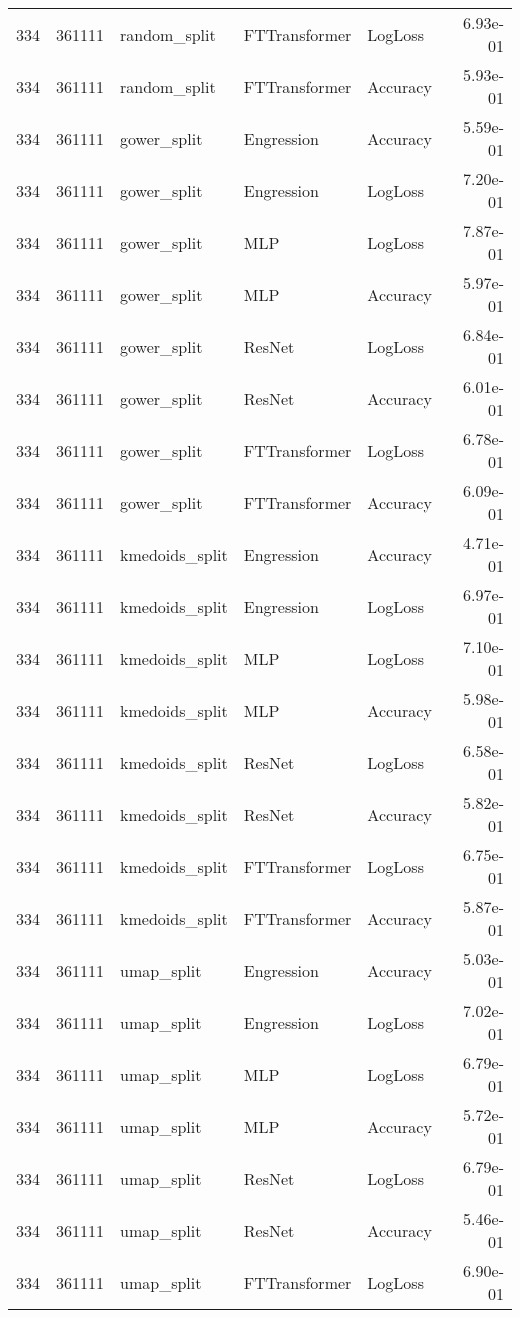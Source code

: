 \begin{tabular}{rrlllr}
334 & 361111 & random\_split & FTTransformer & LogLoss & 6.93e-01 \\
334 & 361111 & random\_split & FTTransformer & Accuracy & 5.93e-01 \\
334 & 361111 & gower\_split & Engression & Accuracy & 5.59e-01 \\
334 & 361111 & gower\_split & Engression & LogLoss & 7.20e-01 \\
334 & 361111 & gower\_split & MLP & LogLoss & 7.87e-01 \\
334 & 361111 & gower\_split & MLP & Accuracy & 5.97e-01 \\
334 & 361111 & gower\_split & ResNet & LogLoss & 6.84e-01 \\
334 & 361111 & gower\_split & ResNet & Accuracy & 6.01e-01 \\
334 & 361111 & gower\_split & FTTransformer & LogLoss & 6.78e-01 \\
334 & 361111 & gower\_split & FTTransformer & Accuracy & 6.09e-01 \\
334 & 361111 & kmedoids\_split & Engression & Accuracy & 4.71e-01 \\
334 & 361111 & kmedoids\_split & Engression & LogLoss & 6.97e-01 \\
334 & 361111 & kmedoids\_split & MLP & LogLoss & 7.10e-01 \\
334 & 361111 & kmedoids\_split & MLP & Accuracy & 5.98e-01 \\
334 & 361111 & kmedoids\_split & ResNet & LogLoss & 6.58e-01 \\
334 & 361111 & kmedoids\_split & ResNet & Accuracy & 5.82e-01 \\
334 & 361111 & kmedoids\_split & FTTransformer & LogLoss & 6.75e-01 \\
334 & 361111 & kmedoids\_split & FTTransformer & Accuracy & 5.87e-01 \\
334 & 361111 & umap\_split & Engression & Accuracy & 5.03e-01 \\
334 & 361111 & umap\_split & Engression & LogLoss & 7.02e-01 \\
334 & 361111 & umap\_split & MLP & LogLoss & 6.79e-01 \\
334 & 361111 & umap\_split & MLP & Accuracy & 5.72e-01 \\
334 & 361111 & umap\_split & ResNet & LogLoss & 6.79e-01 \\
334 & 361111 & umap\_split & ResNet & Accuracy & 5.46e-01 \\
334 & 361111 & umap\_split & FTTransformer & LogLoss & 6.90e-01 \\

\end{tabular}

